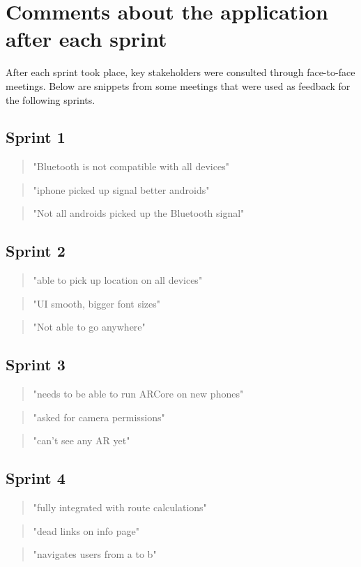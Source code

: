 \section*{Comments about the application after each sprint}
After each sprint took place, key stakeholders were consulted through face-to-face meetings. Below are snippets from some meetings that were used as feedback for the following sprints.

\subsection*{Sprint 1}
\begin{quote}
	"Bluetooth is not compatible with all devices"
\end{quote}

\begin{quote}
	"iphone picked up signal better androids"
\end{quote}

\begin{quote}
	"Not all androids picked up the Bluetooth signal"
\end{quote}

\subsection*{Sprint 2}
\begin{quote}
	"able to pick up location on all devices"
\end{quote}

\begin{quote}
	"UI smooth, bigger font sizes"
\end{quote}

\begin{quote}
	"Not able to go anywhere"
\end{quote}

\subsection*{Sprint 3}
\begin{quote}
	"needs to be able to run ARCore on new phones"
\end{quote}

\begin{quote}
	"asked for camera permissions"
\end{quote}

\begin{quote}
	"can't see any AR yet"
\end{quote}

\subsection*{Sprint 4}
\begin{quote}
	"fully integrated with route calculations"
\end{quote}

\begin{quote}
	"dead links on info page"
\end{quote}

\begin{quote}
	"navigates users from a to b"
\end{quote}